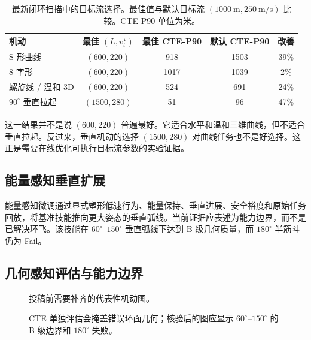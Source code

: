 \documentclass{article}
\newcommand{\vt}{v_t}
\begin{document}
\begin{table}[t]
  \caption{最新闭环扫描中的目标流选择。最佳值与默认目标流 $(1000~\mathrm{m},250~\mathrm{m/s})$ 比较。CTE-P90 单位为米。}
  \label{tab:rhtso-results-cn}
  \centering
  \begin{tabular}{lcccc}
    \toprule
    \textbf{机动} & \textbf{最佳 $(L,\vt^\star)$} & \textbf{最佳 CTE-P90} & \textbf{默认 CTE-P90} & \textbf{改善} \\
    \midrule
    S 形曲线 & $(600,220)$ & 918 & 1503 & 39\% \\
    8 字形 & $(600,220)$ & 1017 & 1039 & 2\% \\
    螺旋线 / 温和 3D & $(600,220)$ & 524 & 691 & 24\% \\
    $90^\circ$ 垂直拉起 & $(1500,280)$ & 51 & 96 & 47\% \\
    \bottomrule
  \end{tabular}
\end{table}

这一结果并不是说 $(600,220)$ 普遍最好。它适合水平和温和三维曲线，但不适合垂直拉起。反过来，垂直机动的选择 $(1500,280)$ 对曲线任务也不是好选择。这正是需要在线优化可执行目标流参数的实验证据。

\subsection{能量感知垂直扩展}

能量感知微调通过显式塑形低速行为、能量保持、垂直进展、安全裕度和原始任务回放，将基准技能推向更大姿态的垂直弧线。当前证据应表述为能力边界，而不是已解决环飞。该技能在 $60^\circ$--$150^\circ$ 垂直弧线下达到 B 级几何质量，而 $180^\circ$ 半筋斗仍为 Fail。

\subsection{几何感知评估与能力边界}

\begin{figure}[t]
  \centering
  \caption{投稿前需要补齐的代表性机动图。}
  \label{fig:maneuvers-cn}
\end{figure}

\begin{figure}[t]
  \centering
  \caption{CTE 单独评估会掩盖错误环面几何；核验后的图应显示 $60^\circ$--$150^\circ$ 的 B 级边界和 $180^\circ$ 失败。}
  \label{fig:vertical-frontier-cn}
\end{figure}
\end{document}
